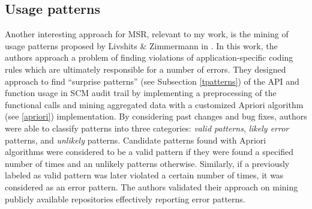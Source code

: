 \subsection{Usage patterns}
Another interesting approach for MSR, relevant to my work, is the mining of usage patterns proposed by Livshits \& Zimmermann in \cite{citeulike:5398684}. In this work, the authors approach a problem of finding violations of application-specific coding rules which are ultimately responsible for a number of errors. They designed approach to find ``surprise patterns'' (see Subsection \ref{tpatterns}) of the API and function usage in SCM audit trail by implementing a preprocessing of the functional calls and mining aggregated data with a customized Apriori algorithm (see \ref{apriori}) implementation. By considering past changes and bug fixes, authors were able to classify patterns into three categories: \textit{valid patterns}, \textit{likely error} patterns, and \textit{unlikely} patterns. Candidate patterns found with Apriori algorithms were considered to be a valid pattern if they were found a specified number of times and an unlikely patterns otherwise. Similarly, if a previously labeled as valid pattern was later violated a certain number of times, it was considered as an error pattern. The authors validated their approach on mining publicly available repositories effectively reporting error patterns.
